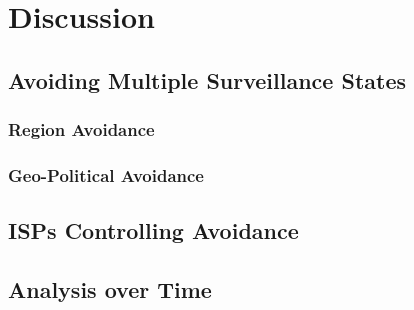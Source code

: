 \section{Discussion}
\label{discussion}

\subsection{Avoiding Multiple Surveillance States}

\subsubsection{Region Avoidance}

\subsubsection{Geo-Political Avoidance}

\subsection{ISPs Controlling Avoidance}

\subsection{Analysis over Time}
